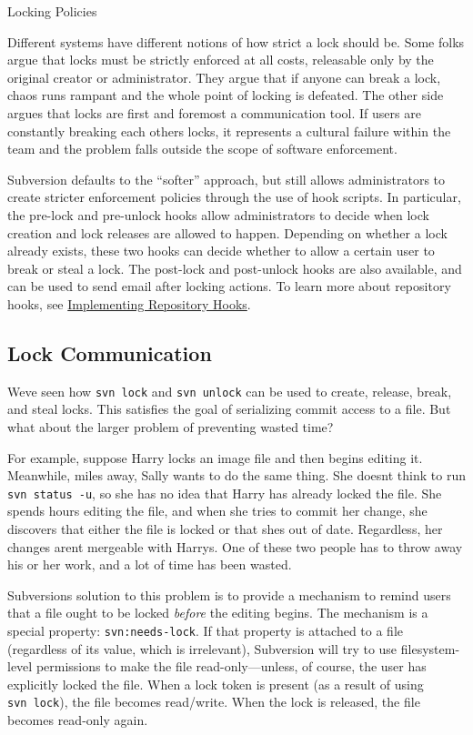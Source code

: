 Locking Policies

Different systems have different notions of how strict a lock should be.
Some folks argue that locks must be strictly enforced at all costs,
releasable only by the original creator or administrator. They argue
that if anyone can break a lock, chaos runs rampant and the whole point
of locking is defeated. The other side argues that locks are first and
foremost a communication tool. If users are constantly breaking each
other\textquotesingle s locks, it represents a cultural failure within
the team and the problem falls outside the scope of software
enforcement.

Subversion defaults to the ``softer'' approach, but still allows
administrators to create stricter enforcement policies through the use
of hook scripts. In particular, the pre-lock and pre-unlock hooks allow
administrators to decide when lock creation and lock releases are
allowed to happen. Depending on whether a lock already exists, these two
hooks can decide whether to allow a certain user to break or steal a
lock. The post-lock and post-unlock hooks are also available, and can be
used to send email after locking actions. To learn more about repository
hooks, see \hyperref[svn.reposadmin.hooks]{Implementing Repository
Hooks}.

\subsection{Lock
Communication}\label{svn.advanced.locking.lock-communication}

We\textquotesingle ve seen how \texttt{svn\ lock} and
\texttt{svn\ unlock} can be used to create, release, break, and steal
locks. This satisfies the goal of serializing commit access to a file.
But what about the larger problem of preventing wasted time?

For example, suppose Harry locks an image file and then begins editing
it. Meanwhile, miles away, Sally wants to do the same thing. She
doesn\textquotesingle t think to run \texttt{svn\ status\ -u}, so she
has no idea that Harry has already locked the file. She spends hours
editing the file, and when she tries to commit her change, she discovers
that either the file is locked or that she\textquotesingle s out of
date. Regardless, her changes aren\textquotesingle t mergeable with
Harry\textquotesingle s. One of these two people has to throw away his
or her work, and a lot of time has been wasted.

Subversion\textquotesingle s solution to this problem is to provide a
mechanism to remind users that a file ought to be locked \emph{before}
the editing begins. The mechanism is a special property:
\texttt{svn:needs-lock}. If that property is attached to a file
(regardless of its value, which is irrelevant), Subversion will try to
use filesystem-level permissions to make the file read-only---unless, of
course, the user has explicitly locked the file. When a lock token is
present (as a result of using \texttt{svn\ lock}), the file becomes
read/write. When the lock is released, the file becomes read-only again.

